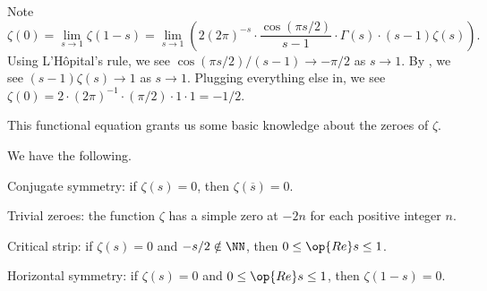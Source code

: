 \documentclass[../notes.tex]{subfiles}
\begin{document}
\begin{example} \label{ex:zeta-zero}
	Note
	\[\zeta(0)=\lim_{s\to1}\zeta(1-s)=\lim_{s\to1}\left(2(2\pi)^{-s}\cdot\frac{\cos(\pi s/2)}{s-1}\cdot\Gamma(s)\cdot(s-1)\zeta(s)\right).\]
	Using L'H\^opital's rule, we see $\cos(\pi s/2)/(s-1)\to-\pi/2$ as $s\to1$. By , we see $(s-1)\zeta(s)\to1$ as $s\to1$. Plugging everything else in, we see $\zeta(0)=2\cdot(2\pi)^{-1}\cdot(\pi/2)\cdot1\cdot1=-1/2$.
\end{example}
This functional equation grants us some basic knowledge about the zeroes of $\zeta$.
\begin{corollary} \label{cor:basic-zeta-zeroes}
	We have the following.
	\begin{listalph}
		\item Conjugate symmetry: if $\zeta(s)=0$, then $\zeta(\overline s)=0$.
		\item Trivial zeroes: the function $\zeta$ has a simple zero at $-2n$ for each positive integer $n$.
		\item Critical strip: if $\zeta(s)=0$ and $-s/2\notin\NN$, then $0\le\op{Re}s\le1$.
		\item Horizontal symmetry: if $\zeta(s)=0$ and $0\le\op{Re}s\le1$, then $\zeta(1-s)=0$.
	\end{listalph}
\end{corollary}
\end{document}
